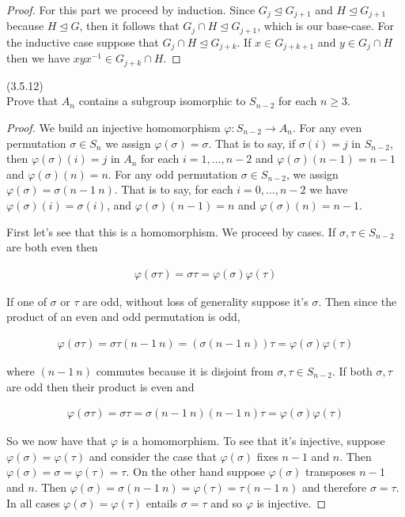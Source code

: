 \documentclass{exam}
\begin{document}
\begin{questions}
\begin{proof}
  For this part we proceed by induction.  Since $G_j\trianglelefteq G_{j+1}$ and $H\trianglelefteq G_{j+1}$ because $H\trianglelefteq G$, then it follows that $G_{j}\cap H\trianglelefteq G_{j+1}$, which is our base-case.  For the inductive case suppose that $G_j\cap H\trianglelefteq G_{j+k}$.  If $x\in G_{j+k+1}$ and $y\in G_j\cap H$ then we have $xyx^{-1}\in G_{j+k}\cap H$.  
\end{proof}

\question(3.5.12)\\
Prove that $A_n$ contains a subgroup isomorphic to $S_{n-2}$ for each $n\geq 3$.

\begin{proof}
  We build an injective homomorphism $\varphi: S_{n-2}\rightarrow A_n$.  For any even permutation $\sigma\in S_n$ we assign $\varphi(\sigma)=\sigma$.  That is to say, if $\sigma(i)=j$ in $S_{n-2}$, then $\varphi(\sigma)(i)=j$ in $A_n$ for each $i=1,\dots,n-2$ and $\varphi(\sigma)(n-1)=n-1$ and $\varphi(\sigma)(n)=n$.  For any odd permutation $\sigma\in S_{n-2}$, we assign $\varphi(\sigma) = \sigma(n-1\ n)$.  That is to say, for each $i=0,\dots,n-2$ we have $\varphi(\sigma)(i) = \sigma(i)$, and $\varphi(\sigma)(n-1) = n$ and $\varphi(\sigma)(n)=n-1$.

  First let's see that this is a homomorphism.  We proceed by cases.  If $\sigma,\tau\in S_{n-2}$ are both even then

  \begin{align*}
    \varphi(\sigma\tau) = \sigma\tau = \varphi(\sigma)\varphi(\tau)
  \end{align*}

  If one of $\sigma$ or $\tau$ are odd, without loss of generality suppose it's $\sigma$.  Then since the product of an even and odd permutation is odd,

  \begin{align*}
    \varphi(\sigma\tau) = \sigma\tau(n-1\ n) = (\sigma(n-1\ n))\tau = \varphi(\sigma)\varphi(\tau)
  \end{align*}

  where $(n-1\ n)$ commutes because it is disjoint from $\sigma,\tau\in S_{n-2}$.  If both $\sigma,\tau$ are odd then their product is even and

  \begin{align*}
    \varphi(\sigma\tau) = \sigma\tau = \sigma(n-1\ n)(n-1\ n)\tau = \varphi(\sigma)\varphi(\tau)
  \end{align*}

  So we now have that $\varphi$ is a homomorphism.  To see that it's injective, suppose $\varphi(\sigma)=\varphi(\tau)$ and consider the case that $\varphi(\sigma)$ fixes $n-1$ and $n$.  Then $\varphi(\sigma) = \sigma = \varphi(\tau)=\tau$.  On the other hand suppose $\varphi(\sigma)$ transposes $n-1$ and $n$.  Then $\varphi(\sigma) = \sigma(n-1\ n) = \varphi(\tau) = \tau(n-1\ n)$ and therefore $\sigma=\tau$.  In all cases $\varphi(\sigma)=\varphi(\tau)$ entails $\sigma=\tau$ and so $\varphi$ is injective.


\end{proof}
\end{questions}
\end{document}
